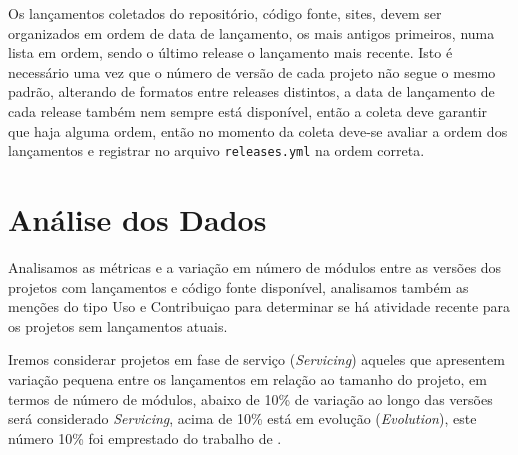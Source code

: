 




Os lançamentos coletados do repositório, código fonte, sites, devem ser
organizados em ordem de data de lançamento, os mais antigos primeiros, numa
lista em ordem, sendo o último release o lançamento mais recente. Isto é
necessário uma vez que o número de versão de cada projeto não segue o mesmo
padrão, alterando de formatos entre releases distintos, a data de lançamento de
cada release também nem sempre está disponível, então a coleta deve garantir
que haja alguma ordem, então no momento da coleta deve-se avaliar a ordem dos
lançamentos e registrar no arquivo \texttt{releases.yml} na ordem correta.


\section{Análise dos Dados} \label{estudo3:analise} %

Analisamos as métricas e a variação em número de módulos entre as versões dos
projetos com lançamentos e código fonte disponível, analisamos também as
menções do tipo Uso e Contribuiçao para determinar se há atividade recente para
os projetos sem lançamentos atuais.

Iremos considerar projetos em fase de serviço ({\it Servicing}) aqueles que
apresentem variação pequena entre os lançamentos em relação ao tamanho do
projeto, em termos de número de módulos, abaixo de 10\% de variação ao longo
das versões será considerado {\it Servicing}, acima de 10\% está em evolução
({\it Evolution}), este número 10\% foi emprestado do trabalho de
.

